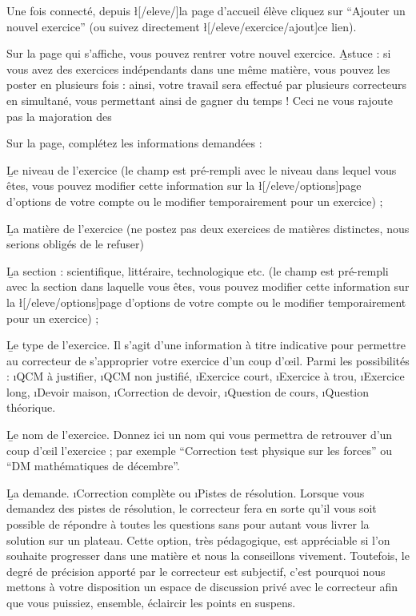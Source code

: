 ﻿Une fois connecté, depuis \l[/eleve/]{la page d’accueil élève} cliquez sur “Ajouter un nouvel exercice” (ou suivez directement \l[/eleve/exercice/ajout]{ce lien}).

Sur la page qui s’affiche, vous pouvez rentrer votre nouvel exercice.
\b{Astuce} : si vous avez des exercices indépendants dans une même matière, vous pouvez les poster en plusieurs fois : ainsi, votre travail sera effectué par plusieurs correcteurs en simultané, vous permettant ainsi de gagner du temps ! Ceci ne vous rajoute pas la majoration des %

Sur la page, complétez les informations demandées :
\item \b{Le niveau de l’exercice} (le champ est pré-rempli avec le niveau dans lequel vous êtes, vous pouvez modifier cette information sur la \l[/eleve/options]{page d’options de votre compte} ou le modifier temporairement pour un exercice) ;
\item \b{La matière} de l’exercice (ne postez pas deux exercices de matières distinctes, nous serions obligés de le refuser)
\item \b{La section} : scientifique, littéraire, technologique etc. (le champ est pré-rempli avec la section dans laquelle vous êtes, vous pouvez modifier cette information sur la \l[/eleve/options]{page d’options de votre compte} ou le modifier temporairement pour un exercice) ;
\item \b{Le type de l’exercice}. Il s’agit d’une information à titre indicative pour permettre au correcteur de s’approprier votre exercice d’un coup d’œil. Parmi les possibilités : \i{QCM à justifier}, \i{QCM non justifié}, \i{Exercice court}, \i{Exercice à trou}, \i{Exercice long}, \i{Devoir maison}, \i{Correction de devoir}, \i{Question de cours}, \i{Question théorique}.
\item \b{Le nom de l’exercice}. Donnez ici un nom qui vous permettra de retrouver d’un coup d’œil l’exercice ; par exemple “Correction test physique sur les forces” ou “DM mathématiques de décembre”.
\item \b{La demande}. \i{Correction complète} ou \i{Pistes de résolution}. Lorsque vous demandez des pistes de résolution, le correcteur fera en sorte qu’il vous soit possible de répondre à toutes les questions sans pour autant vous livrer la solution sur un plateau. Cette option, très pédagogique, est appréciable si l’on souhaite progresser dans une matière et nous la conseillons vivement. Toutefois, le degré de précision apporté par le correcteur est subjectif, c’est pourquoi nous mettons à votre disposition un espace de discussion privé avec le correcteur afin que vous puissiez, ensemble, éclaircir les points en suspens.
